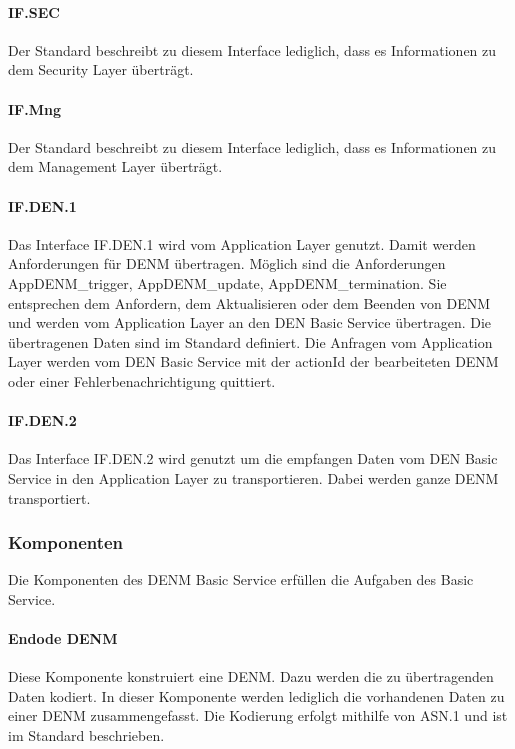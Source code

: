 \paragraph{IF.SEC}
Der Standard \cite{en302637-3} beschreibt zu diesem Interface lediglich, dass es Informationen zu dem Security Layer überträgt.  
\paragraph{IF.Mng}
Der Standard \cite{en302637-3} beschreibt zu diesem Interface lediglich, dass es Informationen zu dem Management Layer überträgt. 
\paragraph{IF.DEN.1}
Das Interface IF.DEN.1 wird vom Application Layer genutzt. Damit werden Anforderungen für \ac{DENM} übertragen. Möglich sind die Anforderungen AppDENM\_trigger, AppDENM\_update, AppDENM\_termination. Sie entsprechen dem Anfordern, dem Aktualisieren oder dem Beenden von \ac{DENM} und werden vom Application Layer an den \ac{DEN} Basic Service übertragen. Die übertragenen Daten sind im Standard \cite{en302637-3} definiert. Die Anfragen vom Application Layer werden vom \ac{DEN} Basic Service mit der actionId der bearbeiteten \ac{DENM} oder einer Fehlerbenachrichtigung quittiert.
\paragraph{IF.DEN.2}
Das Interface IF.DEN.2 wird genutzt um die empfangen Daten vom \ac{DEN} Basic Service in den Application Layer zu transportieren. Dabei werden ganze \ac{DENM} transportiert.


\subsubsection{Komponenten}
Die Komponenten des \ac{DENM} Basic Service erfüllen die Aufgaben des Basic Service.

\paragraph{Endode DENM \label{facilitylayer_EncodeDENM}}
Diese Komponente konstruiert eine \ac{DENM}. Dazu werden die zu übertragenden Daten kodiert. In dieser Komponente werden lediglich die vorhandenen Daten zu einer \ac{DENM} zusammengefasst. Die Kodierung erfolgt mithilfe von \ac{ASN.1} und ist im Standard \cite{en302637-3} beschrieben. 

